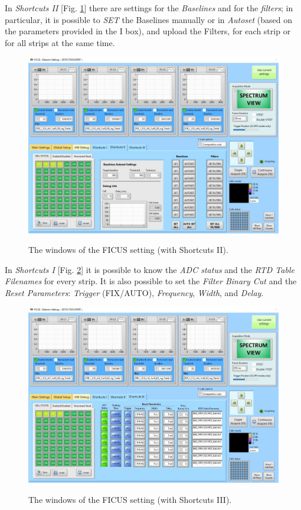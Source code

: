 \documentclass[a4paper,12pt,oneside,pdflatex,italian,final,twocolumn]{article}
\begin{document}
In \textit{Shortcuts II} [Fig. \ref{fig:fig14}] there are settings for the \textit{Baselines} and for the \textit{filters}; in particular, it is possible to \textit{SET} the Baselines manually or in \textit{Autoset} (based on the parameters provided in the I box), and upload the Filters, for each strip or for all strips at the same time. 

\begin{figure}[h]
\centering
{\includegraphics[width=.85\textwidth]{Capture12.jpg}} \quad
\caption{The windows of the FICUS setting (with Shortcuts II).}\label{fig:fig14}
\end{figure}

In \textit{Shortcuts I\textit{\textit{}}} [Fig. \ref{fig:fig15}] it is possible to know the \textit{ADC status} and the \textit{RTD Table Filenames} for every strip. It is also possible to set the \textit{Filter Binary Cut} and the \textit{Reset Parameters}: \textit{Trigger} (FIX/AUTO), \textit{Frequency}, \textit{Width}, and \textit{Delay}.

\begin{figure}[h]
\centering
{\includegraphics[width=.85\textwidth]{Capture13.jpg}} \quad
\caption{The windows of the FICUS setting (with Shortcuts III).}\label{fig:fig15}
\end{figure}
\end{document}
